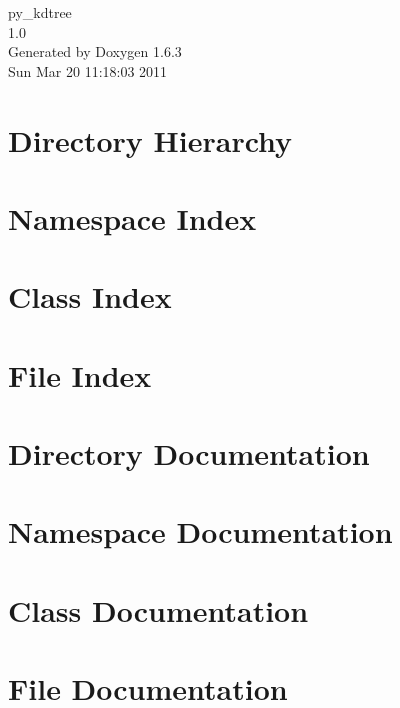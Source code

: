 \documentclass[a4paper]{book}
\begin{document}
\hypersetup{pageanchor=false}
\begin{titlepage}
\vspace*{7cm}
\begin{center}
{\Large py\_\-kdtree \\[1ex]\large 1.0 }\\
\vspace*{1cm}
{\large Generated by Doxygen 1.6.3}\\
\vspace*{0.5cm}
{\small Sun Mar 20 11:18:03 2011}\\
\end{center}
\end{titlepage}
\clearemptydoublepage
{}
\tableofcontents
\clearemptydoublepage
{}
\hypersetup{pageanchor=true}
\chapter{Directory Hierarchy}

\chapter{Namespace Index}

\chapter{Class Index}

\chapter{File Index}

\chapter{Directory Documentation}


\chapter{Namespace Documentation}


\chapter{Class Documentation}






\chapter{File Documentation}










\printindex
\end{document}
